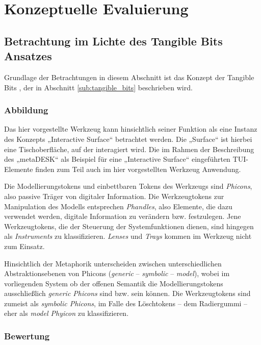 \chapter{Konzeptuelle Evaluierung} %
\label{cha:konzeptuelle_evaluierung}

\section{Betrachtung im Lichte des Tangible Bits Ansatzes} %
\label{sec:betrachtung_tangible_bits}

Grundlage der Betrachtungen in diesem Abschnitt ist das Konzept der Tangible Bits \citep{Ishii97}, der in Abschnitt \ref{sub:tangible_bits} beschrieben wird.

\subsection{Abbildung} %

Das hier vorgestellte Werkzeug kann hinsichtlich seiner Funktion als eine Instanz des Konzepts „Interactive Surface“ betrachtet werden. Die „Surface“ ist hierbei eine Tischoberfläche, auf der interagiert wird. Die im Rahmen der Beschreibung des „metaDESK“ \citep{Ullmer97} als Beispiel für eine „Interactive Surface“ eingeführten \gls{TUI}-Elemente finden zum Teil auch im hier vorgestellten Werkzeug Anwendung.

Die Modellierungstokens und einbettbaren Tokens des Werkzeugs sind \emph{Phicons}, also passive Träger von digitaler Information. Die Werkzeugtokens zur Manipulation des Modells entsprechen \emph{Phandles}, also Elemente, die dazu verwendet werden, digitale Information zu verändern bzw. festzulegen. Jene Werkzeugtokens, die der Steuerung der Systemfunktionen dienen, sind hingegen als \emph{Instruments} zu klassifizieren. \emph{Lenses} und \emph{Trays} kommen im Werkzeug nicht zum Einsatz.

Hinsichtlich der Metaphorik unterscheiden \citet{Ullmer97} zwischen unterschiedlichen Abstraktionsebenen von Phicons (\emph{generic} -- \emph{symbolic} -- \emph{model}), wobei im vorliegenden System ob der offenen Semantik die Modellierungstokens ausschließlich \emph{generic Phicons} sind bzw. sein können. Die Werkzeugtokens sind zumeist als \emph{symbolic Phicons}, im Falle des Löschtokens -- dem Radiergummi -- eher als \emph{model Phyicon} zu klassifizieren.

\subsection{Bewertung} %

